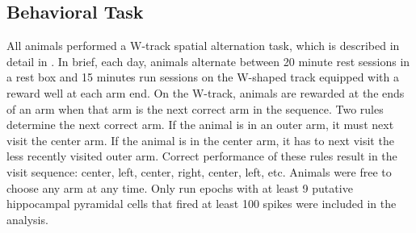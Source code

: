 \documentclass[9pt,lineno]{elife}
\begin{document}
\subsection*{Behavioral Task}
All animals performed a W-track spatial alternation task, which is described in detail in \cite{KarlssonAwakereplayremote2009}. In brief, each day, animals alternate between 20 minute rest sessions in a rest box and 15 minutes run sessions on the W-shaped track equipped with a reward well at each arm end. On the W-track, animals are rewarded at the ends of an arm when that arm is the next correct arm in the sequence. Two rules determine the next correct arm. If the animal is in an outer arm, it must next visit the center arm. If the animal is in the center arm, it has to next visit the less recently visited outer arm. Correct performance of these rules result in the visit sequence: center, left, center, right, center, left, etc. Animals were free to choose any arm at any time. Only run epochs with at least 9 putative hippocampal pyramidal cells that fired at least 100 spikes were included in the analysis.
\end{document}
